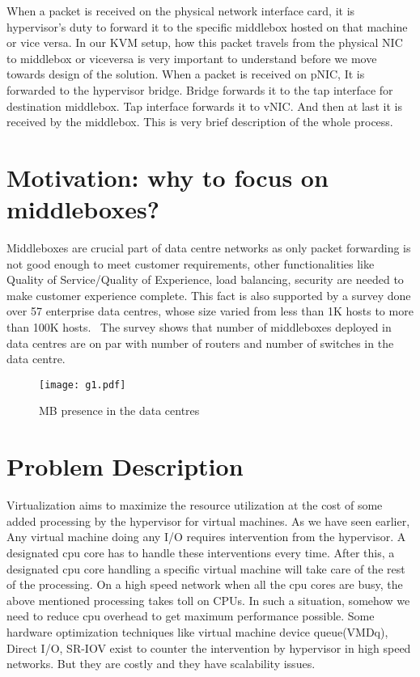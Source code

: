 \documentclass[a4paper,11pt]{report}
\begin{document}
When a packet is received on the physical network interface card, it is hypervisor's duty to forward it to the specific middlebox hosted on that machine or vice versa. In our KVM setup, how this packet travels from the physical NIC to middlebox or viceversa is very important to understand before we move towards design of the solution. When a packet is received on pNIC, It is forwarded to the hypervisor bridge. Bridge forwards it to the tap interface for destination middlebox. Tap interface forwards it to vNIC. And then at last it is received by the middlebox. This is very brief description of the whole process.
\section{Motivation: why to focus on middleboxes?}
Middleboxes are crucial part of data centre networks as only packet forwarding is not good enough to meet customer requirements, other functionalities like Quality of Service/Quality of Experience, load balancing, security are needed to make customer experience complete. This fact is also supported by a survey done over 57 enterprise data centres, whose size varied from less than 1K hosts to more than 100K hosts.~\cite{DM} The survey shows that number of middleboxes deployed in data centres are on par with number of routers and number of switches in the data centre.  
\begin{figure}[h]
\centering
\texttt{[image: g1.pdf]}
\caption{MB presence in the data centres~\cite{DM}}
\end{figure} 
\section{Problem Description}        
Virtualization aims to maximize the resource utilization at the cost of some added processing by the hypervisor for virtual machines. As we have seen earlier, Any virtual machine doing any I/O requires intervention from the hypervisor. A designated cpu core has to handle these interventions every time. After this, a designated cpu core handling a specific virtual machine will take care of the rest of the processing. On a high speed network when all the cpu cores are busy, the above mentioned processing takes toll on CPUs. In such a situation, somehow we need to reduce cpu overhead to get maximum performance possible. Some hardware optimization techniques like virtual machine device queue(VMDq), Direct I/O, SR-IOV exist to counter the intervention by hypervisor in high speed networks. But they are costly and they have scalability issues. 
\end{document}
